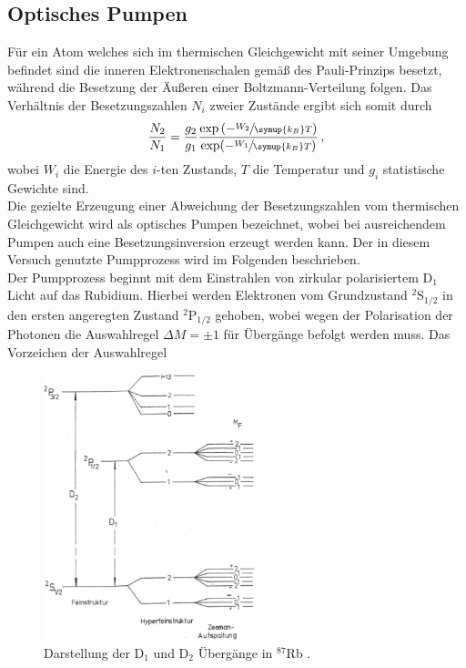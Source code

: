 \subsection{Optisches Pumpen}
Für ein Atom welches sich im thermischen Gleichgewicht mit seiner Umgebung befindet sind die inneren Elektronenschalen gemäß des Pauli-Prinzips besetzt, während die Besetzung der Äußeren einer Boltzmann-Verteilung folgen. Das Verhältnis der Besetzungszahlen $N_i$ zweier Zustände ergibt sich somit durch
\begin{equation}
  \frac{N_2}{N_1}=\frac{g_2}{g_1}\frac{\exp\left(-\sfrac{W_2}{\symup{k_B}T}\right)}{\exp(-\sfrac{W_1}{\symup{k_B}T})}\,,
\end{equation}
wobei $W_i$ die Energie des $i$-ten Zustands, $T$ die Temperatur und $g_i$ statistische Gewichte sind.\\
Die gezielte Erzeugung einer Abweichung der Besetzungszahlen vom thermischen Gleichgewicht wird als optisches Pumpen bezeichnet, wobei bei ausreichendem Pumpen auch eine Besetzungsinversion erzeugt werden kann. Der in diesem Versuch genutzte Pumpprozess wird im Folgenden beschrieben.\\
Der Pumpprozess beginnt mit dem Einstrahlen von zirkular polarisiertem D$_1$ Licht auf das Rubidium. Hierbei werden Elektronen vom Grundzustand $^2$S$_{1/2}$ in den ersten angeregten Zustand $^2$P$_{1/2}$ gehoben, wobei wegen der Polarisation der Photonen die Auswahlregel $\Delta M=\pm1$ für Übergänge befolgt werden muss. Das Vorzeichen der Auswahlregel
\begin{figure}
  \centering
  \includegraphics[width=0.55\textwidth]{Bilder/D1}
  \caption{Darstellung der D$_1$ und D$_2$ Übergänge in $^{87}$Rb \cite{D1}.}
\end{figure}
